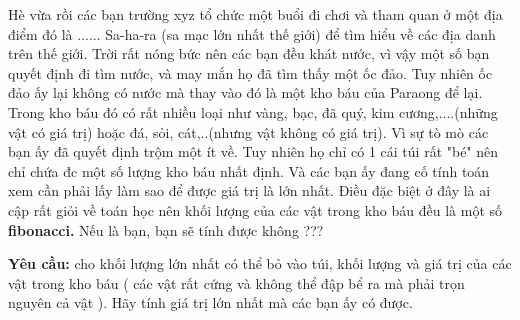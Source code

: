 Hè vừa rồi các bạn trường xyz tổ chức một buổi đi chơi và tham quan ở một địa điểm đó là ...... Sa-ha-ra (sa mạc lớn nhất thế giới) để tìm hiểu về các địa danh trên thế giới. Trời rất nóng bức nên các bạn đều khát nước, vì vậy một số bạn quyết định đi tìm nước, và may mắn họ đã tìm thấy một ốc đảo. Tuy nhiên ốc đảo ấy lại không có nước mà thay vào đó là một kho báu của Paraong để lại. Trong kho báu đó có rất nhiều loại như vàng, bạc, đã quý, kim cương,....(những vật có giá trị) hoặc đá, sỏi, cát,..(nhưng vật không có giá trị). Vì sự tò mò các bạn ấy đã quyết định trộm một ít về. Tuy nhiên họ chỉ có 1 cái túi rất "bé" nên chỉ chứa đc một số lượng kho báu nhất định. Và các bạn ấy đang cố tính toán xem cần phải lấy làm sao để được giá trị là lớn nhất. Điều đặc biệt ở đây là ai cập rất giỏi về toán học nên khối lượng của các vật trong kho báu đều là một số \textbf{ fibonacci. } Nếu là bạn, bạn sẽ tính được không ???

\textbf{Yêu cầu: } cho khối lượng lớn nhất có thể bỏ vào túi, khối lượng và giá trị của các vật trong kho báu ( các vật rất cứng và không thể đập bể ra mà phải trọn nguyên cả vật ). Hãy tính giá trị lớn nhất mà các bạn ấy có được.